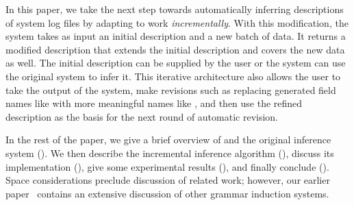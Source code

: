 In this paper, we take the next step towards automatically inferring
descriptions of system log files by adapting \learnpads{} to work
\textit{incrementally}.  With this modification, the system takes as input
an initial description and a new batch of data. It returns a modified
description that extends the initial description and covers the new
data as well. The initial description
can be supplied by the user or the system can use the original
\learnpads{} system to infer it.  This iterative architecture also
allows the user to take the output of the system, make revisions such
as replacing generated field names like  with more meaningful
names like , and then use the refined description as the
basis for the next round of automatic revision.

In the rest of the paper, we give a brief overview of \pads{} and the
original inference system ().  We then describe
the incremental inference algorithm (), discuss its
implementation (), give some experimental results (),
and finally conclude (). Space considerations
preclude discussion of related work; however, our earlier
paper~\cite{Fisher+:dirttoshovels} contains an extensive discussion of
other grammar induction systems.

%
%
%
